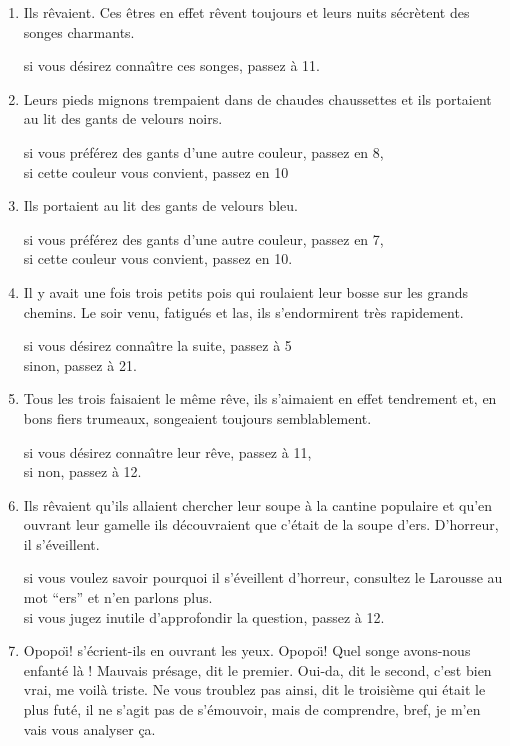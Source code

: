 {\begin{multicols}{2}
\begin{enumerate}
si vous pr\'ef\'erez qu'ils r\^event, passez \`a 6,\\
sinon, passez \`a 7.

\item Ils r\^evaient. Ces \^etres en effet r\^event toujours et leurs nuits
s\'ecr\`etent des songes charmants.

si vous d\'esirez conna\^\i tre ces songes, passez \`a 11.\\

\item Leurs pieds mignons trempaient dans de chaudes chaussettes et ils
portaient au lit des gants de velours noirs.

si vous pr\'ef\'erez des gants d'une autre couleur, passez en 8,\\
si cette couleur vous convient, passez en 10

\item Ils portaient au lit des gants de velours bleu.

si vous pr\'ef\'erez des gants d'une autre couleur, passez en 7,\\
si cette couleur vous convient, passez en 10.

\item Il y avait une fois trois petits pois qui roulaient leur bosse sur les
grands chemins. Le soir venu, fatigu\'es et las, ils s'endormirent tr\`es
rapidement.

si vous d\'esirez conna\^\i tre la suite, passez \`a 5\\
sinon, passez \`a 21.

\item Tous les trois faisaient le m\^eme r\^eve, ils s'aimaient en effet
tendrement et, en bons fiers trumeaux, songeaient toujours semblablement.

si vous d\'esirez conna\^\i tre leur r\^eve, passez \`a 11,\\
si non, passez \`a 12.

\item Ils r\^evaient qu'ils allaient chercher leur soupe \`a la cantine populaire
et qu'en ouvrant leur gamelle ils d\'ecouvraient que c'\'etait de la soupe d'ers.
D'horreur, il s'\'eveillent.

si vous voulez savoir pourquoi il s'\'eveillent d'horreur, consultez le Larousse
au mot ``ers'' et n'en parlons plus.\\
si vous jugez inutile d'approfondir la question, passez \`a 12.

\item Opopo\"\i ! s'\'ecrient-ils en ouvrant les yeux. Opopo\"\i ! Quel songe
avons-nous enfant\'e l\`a ! Mauvais pr\'esage, dit le premier. Oui-da, dit le
second, c'est bien vrai, me voil\`a triste. Ne vous troublez pas ainsi, dit le
troisi\`eme qui \'etait le plus fut\'e, il ne s'agit pas de s'\'emouvoir, mais de
comprendre, bref, je m'en vais vous analyser \c ca.


\end{enumerate}
\end{multicols}}
